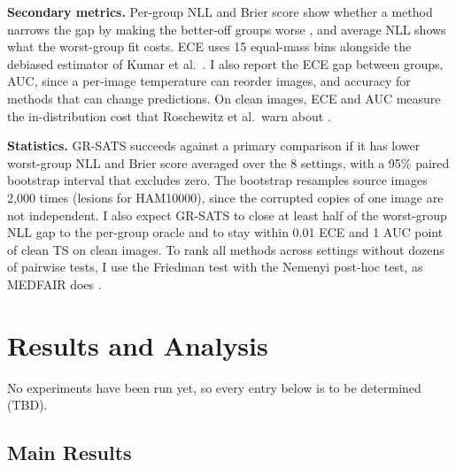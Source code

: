 \documentclass[sigconf,nonacm]{acmart}
\begin{document}
\textbf{Secondary metrics.} Per-group NLL and Brier score show whether a method narrows the gap by making the better-off groups worse \cite{zong2023medfair}, and average NLL shows what the worst-group fit costs. ECE uses 15 equal-mass bins \cite{roelofs2022mitigating} alongside the debiased estimator of Kumar et al.\ \cite{kumar2019verified}. I also report the ECE gap between groups, AUC, since a per-image temperature can reorder images, and accuracy for methods that can change predictions. On clean images, ECE and AUC measure the in-distribution cost that Roschewitz et al.\ warn about \cite{roschewitz2025where}.

\textbf{Statistics.} GR-SATS succeeds against a primary comparison if it has lower worst-group NLL and Brier score averaged over the 8 settings, with a 95\% paired bootstrap interval that excludes zero. The bootstrap resamples source images 2,000 times (lesions for HAM10000), since the corrupted copies of one image are not independent. I also expect GR-SATS to close at least half of the worst-group NLL gap to the per-group oracle and to stay within 0.01 ECE and 1 AUC point of clean TS on clean images. To rank all methods across settings without dozens of pairwise tests, I use the Friedman test with the Nemenyi post-hoc test, as MEDFAIR does \cite{zong2023medfair}.

\section{Results and Analysis}
\label{sec:results}

No experiments have been run yet, so every entry below is to be determined (TBD).

\subsection{Main Results}
\end{document}
